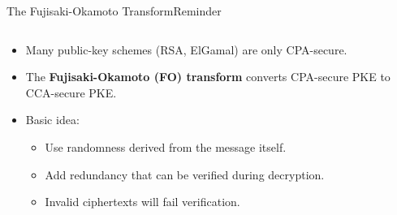 \documentclass[aspectratio=169, lualatex, handout]{beamer}
\begin{document}
\begin{frame}{The Fujisaki-Okamoto Transform}{Reminder}
	\begin{columns}[c]
		\begin{column}{0.6\textwidth}
			\begin{itemize}[<+->]
				\item Many public-key schemes (RSA, ElGamal) are only CPA-secure.
				\item The \textbf{Fujisaki-Okamoto (FO) transform} converts CPA-secure PKE to CCA-secure PKE.
				\item Basic idea:
				      \begin{itemize}
					      \item Use randomness derived from the message itself.
					      \item Add redundancy that can be verified during decryption.
					      \item Invalid ciphertexts will fail verification.
				      \end{itemize}
			\end{itemize}
		\end{column}
		\begin{column}{0.4\textwidth}
		\end{column}
	\end{columns}
\end{frame}
\end{document}
